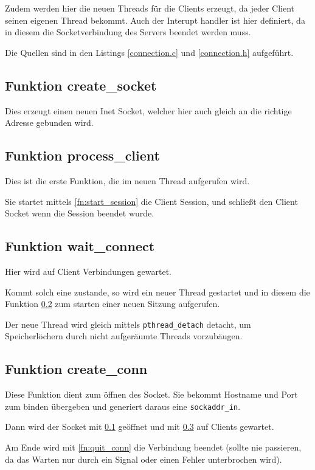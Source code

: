 \documentclass[pdftex,final,a4paper,10pt,notitlepage,halfparskip]{scrreprt}
\begin{document}
Zudem werden hier die neuen Threads für die Clients erzeugt, da jeder Client seinen eigenen Thread bekommt. Auch der Interupt handler ist hier definiert, da in diesem die Socketverbindung des Servers beendet werden muss.

Die Quellen sind in den Listings \ref{connection.c} und \ref{connection.h} aufgeführt.




\subsection{Funktion create\_socket}\label{fn:create_socket}
Dies erzeugt einen neuen Inet Socket, welcher hier auch gleich an die richtige Adresse gebunden wird.

\subsection{Funktion process\_client}\label{fn:process_client}
Dies ist die erste Funktion, die im neuen Thread aufgerufen wird.

Sie startet mittels \ref{fn:start_session} die Client Session, und schließt den Client Socket wenn die Session beendet wurde.

\subsection{Funktion wait\_connect}\label{fn:wait_connect}
Hier wird auf Client Verbindungen gewartet. 

Kommt solch eine zustande, so wird ein neuer Thread gestartet und in diesem die Funktion \ref{fn:process_client} zum starten einer neuen Sitzung aufgerufen.

Der neue Thread wird gleich mittels \texttt{pthread\_detach} detacht, um Speicherlöchern durch nicht aufgeräumte Threads vorzubäugen.

\subsection{Funktion create\_conn}\label{fn:create_conn}
Diese Funktion dient zum öffnen des Socket. Sie bekommt Hostname und Port zum binden übergeben und generiert daraus eine \texttt{sockaddr\_in}.

Dann wird der Socket mit \ref{fn:create_socket} geöffnet und mit \ref{fn:wait_connect} auf Clients gewartet.

Am Ende wird mit \ref{fn:quit_conn} die Verbindung beendet (sollte nie passieren, da das Warten nur durch ein Signal oder einen Fehler unterbrochen wird).
\end{document}
